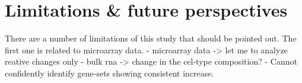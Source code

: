 \section{Limitations \& future perspectives}
There are a number of limitations of this study that should be pointed out. The first one is related to microarray data. 
- microarray data -> let me to analyze reative changes only
- bulk rna -> change in the cel-type composition?
- Cannot confidently identify gene-sets showing consistent increase.


